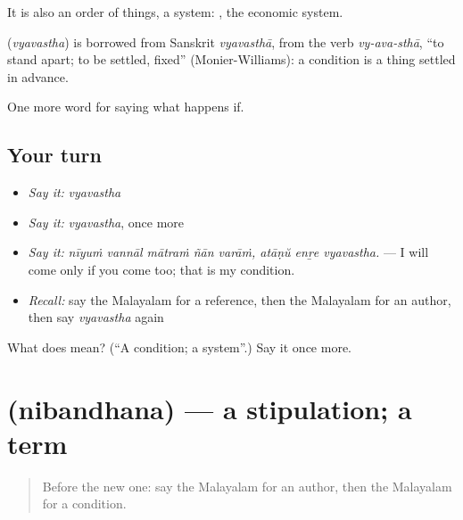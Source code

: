 It is also an order of things, a system:  , the economic system.

\begin{cousinweb}
\textbf{} (\emph{vyavastha}) is borrowed from Sanskrit \emph{vyavasthā}, from the verb \emph{vy-ava-sthā}, \textquotedblleft{}to stand apart; to be settled, fixed\textquotedblright{} (Monier-Williams): a condition is a thing settled in advance.
\end{cousinweb}

\begin{grammarlens}[title={What you've built}]
One more word for saying what happens if.
\end{grammarlens}

\subsection*{Your turn}
\begin{itemize}
\raggedright
  \item \emph{Say it:} \emph{vyavastha}
  \item \emph{Say it:} \emph{vyavastha}, once more
  \item \emph{Say it:} \emph{nīyuṁ vannāl mātraṁ ñān varāṁ, atāṇŭ enṟe vyavastha.} — I will come only if you come too; that is my condition.
  \item \emph{Recall:} say the Malayalam for a reference, then the Malayalam for an author, then say \emph{vyavastha} again
\end{itemize}

\begin{tcolorbox}[breakable,colback=teal!4,colframe=teal!35!black,title={Before you move on}]
What does  mean? (\textquotedblleft{}A condition; a system\textquotedblright{}.) Say it once more.
\end{tcolorbox}
\section[\texorpdfstring{\ml{നിബന്ധന} (nibandhana)}{നിബന്ധന (nibandhana)}]{ (nibandhana) — a stipulation; a term}

\label{lesson:ML-C440-nibandhana}



\begin{quote}
Before the new one: say the Malayalam for an author, then the Malayalam for a condition.
\end{quote}

